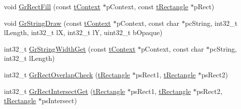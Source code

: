 \begin{DoxyCompactItemize}
\item 
void \hyperlink{group__primitives__api_ga65f2aa809c5723b88101f359932bd530}{Gr\+Rect\+Fill} (const \hyperlink{structt_context}{t\+Context} $\ast$p\+Context, const \hyperlink{structt_rectangle}{t\+Rectangle} $\ast$p\+Rect)
\item 
void \hyperlink{group__primitives__api_gab35261557a43153d24d1e47a49045eba}{Gr\+String\+Draw} (const \hyperlink{structt_context}{t\+Context} $\ast$p\+Context, const char $\ast$pc\+String, int32\+\_\+t l\+Length, int32\+\_\+t l\+X, int32\+\_\+t l\+Y, uint32\+\_\+t b\+Opaque)
\item 
int32\+\_\+t \hyperlink{group__primitives__api_gaef1001f33e34e2cfc2684b106fd2ca24}{Gr\+String\+Width\+Get} (const \hyperlink{structt_context}{t\+Context} $\ast$p\+Context, const char $\ast$pc\+String, int32\+\_\+t l\+Length)
\item 
int32\+\_\+t \hyperlink{group__primitives__api_ga494519532b286c0c63053b92900cbb32}{Gr\+Rect\+Overlap\+Check} (\hyperlink{structt_rectangle}{t\+Rectangle} $\ast$ps\+Rect1, \hyperlink{structt_rectangle}{t\+Rectangle} $\ast$ps\+Rect2)
\item 
int32\+\_\+t \hyperlink{group__primitives__api_ga2a68b368cf20522cc2cb05897b384948}{Gr\+Rect\+Intersect\+Get} (\hyperlink{structt_rectangle}{t\+Rectangle} $\ast$ps\+Rect1, \hyperlink{structt_rectangle}{t\+Rectangle} $\ast$ps\+Rect2, \hyperlink{structt_rectangle}{t\+Rectangle} $\ast$ps\+Intersect)
\end{DoxyCompactItemize}
